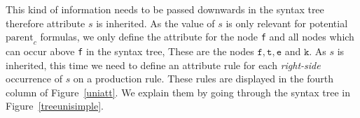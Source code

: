 %
%
%
This kind of information needs to be passed downwards in the syntax tree therefore attribute $s$ is inherited. 
As the value of $s$ is only relevant for potential $\text{parent}_c$ formulas,
we only define the attribute for the node \texttt{f} and all nodes which can occur above \texttt{f} in the syntax tree,
These are the nodes $\texttt{f}, \texttt{t}, \texttt{e}$ and $\texttt{k}$. 
%
As $s$ is inherited, this time we need to define an attribute rule for each \emph{right-side} occurrence of $s$ on a production rule.
These rules are displayed in the fourth column of Figure~\ref{uniatt}. We explain them by going through the syntax tree in Figure~\ref{treeunisimple}.

